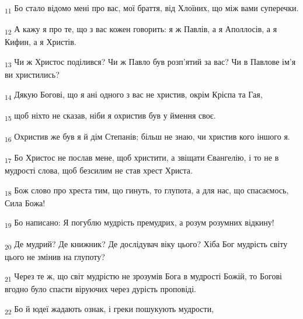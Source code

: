 \begin{tcolorbox}
\textsubscript{11} Бо стало відомо мені про вас, мої браття, від Хлоїних, що між вами суперечки.
\end{tcolorbox}
\begin{tcolorbox}
\textsubscript{12} А кажу я про те, що з вас кожен говорить: я ж Павлів, а я Аполлосів, а я Кифин, а я Христів.
\end{tcolorbox}
\begin{tcolorbox}
\textsubscript{13} Чи ж Христос поділився? Чи ж Павло був розп'ятий за вас? Чи в Павлове ім'я ви христились?
\end{tcolorbox}
\begin{tcolorbox}
\textsubscript{14} Дякую Богові, що я ані одного з вас не христив, окрім Кріспа та Гая,
\end{tcolorbox}
\begin{tcolorbox}
\textsubscript{15} щоб ніхто не сказав, ніби я охристив був у ймення своє.
\end{tcolorbox}
\begin{tcolorbox}
\textsubscript{16} Охристив же був я й дім Степанів; більш не знаю, чи христив кого іншого я.
\end{tcolorbox}
\begin{tcolorbox}
\textsubscript{17} Бо Христос не послав мене, щоб христити, а звіщати Євангелію, і то не в мудрості слова, щоб безсилим не став хрест Христа.
\end{tcolorbox}
\begin{tcolorbox}
\textsubscript{18} Бож слово про хреста тим, що гинуть, то глупота, а для нас, що спасаємось, Сила Божа!
\end{tcolorbox}
\begin{tcolorbox}
\textsubscript{19} Бо написано: Я погублю мудрість премудрих, а розум розумних відкину!
\end{tcolorbox}
\begin{tcolorbox}
\textsubscript{20} Де мудрий? Де книжник? Де дослідувач віку цього? Хіба Бог мудрість світу цього не змінив на глупоту?
\end{tcolorbox}
\begin{tcolorbox}
\textsubscript{21} Через те ж, що світ мудрістю не зрозумів Бога в мудрості Божій, то Богові вгодно було спасти віруючих через дурість проповіді.
\end{tcolorbox}
\begin{tcolorbox}
\textsubscript{22} Бо й юдеї жадають ознак, і греки пошукують мудрости,
\end{tcolorbox}

